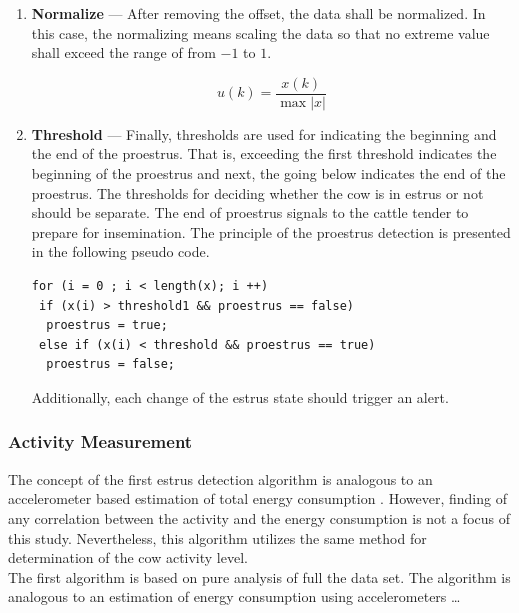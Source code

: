 \documentclass[english,12pt,a4paper,pdftex,elec,utf8]{aaltothesis}
\newcommand{\Clanguage}{\lstset{
  language=C++,                %
  basicstyle=\ttfamily,
  title=\lstname,                 %
}}
\begin{document}
\begin{enumerate}
\item \textbf{Normalize} --- After removing the offset, the data shall be normalized. In this case, the normalizing means scaling the data so that no extreme value shall exceed the range of from $-1$ to $1$.

\begin{equation}
u(k) = \frac{x(k)}{\max  \left| x \right|} 
\end{equation}


\item \textbf{Threshold} --- Finally, thresholds are used for indicating the beginning and the end of the proestrus. That is, exceeding the first threshold indicates the beginning of the proestrus and next, the going below indicates the end of the proestrus. The thresholds for deciding whether the cow is in estrus or not should be separate. The end of proestrus signals to the cattle tender to prepare for insemination. The principle of the proestrus detection is presented in the following pseudo code.  \\

\Clanguage
\begin{lstlisting}
for (i = 0 ; i < length(x); i ++)
 if (x(i) > threshold1 && proestrus == false)	
  proestrus = true;
 else if (x(i) < threshold && proestrus == true)
  proestrus = false;	
\end{lstlisting}
Additionally, each change of the estrus state should trigger an alert.


\end{enumerate}


\subsubsection{Activity Measurement} \label{activitymeasurementsection}

The concept of the first estrus detection algorithm is analogous to an accelerometer based estimation of total energy consumption \cite{Kang2012}. However, finding of any correlation between the activity and the energy consumption is not a focus of this study. Nevertheless, this algorithm utilizes the same method for determination of the cow activity level. \\


The first algorithm is based on pure analysis of full the data set. The algorithm is analogous to an estimation of energy consumption using accelerometers   \dots \\
\end{document}
